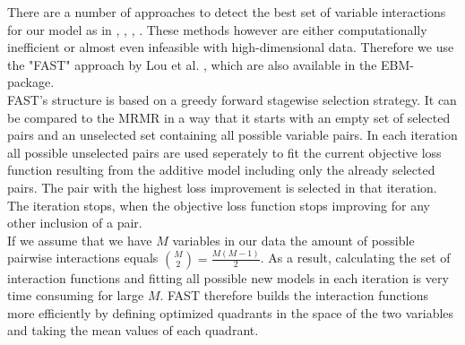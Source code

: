 \documentclass[12pt,titlepage]{article}
\begin{document}
\noindent
There are a number of approaches to detect the best set of variable interactions for our model as in \cite{anova_interaction}, \cite{pdf_interaction}, \cite{guide}, \cite{grove}. These methods however are either computationally inefficient or almost even infeasible with high-dimensional data. Therefore we use the "FAST" approach by Lou et al. \cite{ga2m}, which are also available in the EBM-package. \\
FAST's structure is based on a greedy forward stagewise selection strategy. It can be compared to the MRMR in a way that it starts with an empty set of selected pairs and an unselected set containing all possible variable pairs. In each iteration all possible unselected pairs are used seperately to fit the current objective loss function resulting from the additive model including only the already selected pairs. The pair with the highest loss improvement is selected in that iteration. The iteration stops, when the objective loss function stops improving for any other inclusion of a pair. \\
If we assume that we have $M$ variables in our data the amount of possible pairwise interactions equals $\binom{M}{2} = \frac{M(M-1)}{2}$. As a result, calculating the set of interaction functions and fitting all possible new models in each iteration is very time consuming for large $M$. FAST therefore builds the interaction functions more efficiently by defining optimized quadrants in the space of the two variables and taking the mean values of each quadrant. \\
\end{document}
